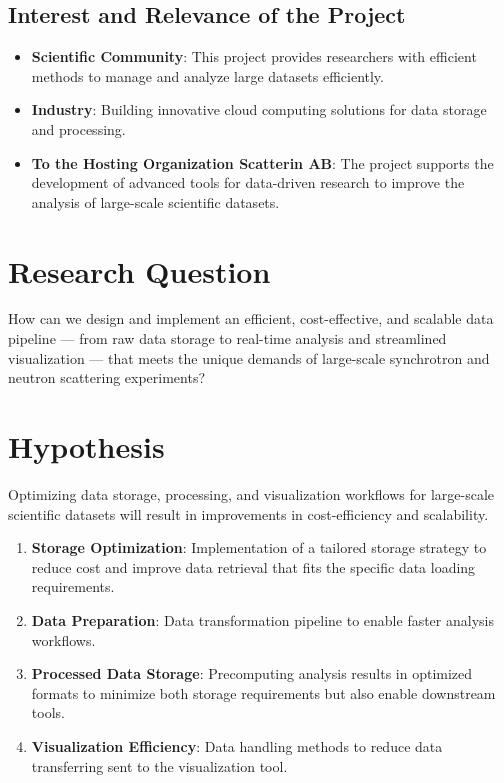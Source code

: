 \documentclass{article}
\begin{document}
\subsection{Interest and Relevance of the Project}
\begin{itemize}
    \item \textbf{Scientific Community}: This project provides researchers with efficient methods to manage and analyze large datasets efficiently.
    \item \textbf{Industry}: Building innovative cloud computing solutions for data storage and processing.
    \item \textbf{To the Hosting Organization Scatterin AB}: The project supports the development of advanced tools for data-driven research to improve the analysis of large-scale scientific datasets.
\end{itemize}

\section{Research Question}
How can we design and implement an efficient, cost-effective, and scalable data pipeline — from raw data storage to real-time analysis and streamlined visualization — that meets the unique demands of large-scale synchrotron and neutron scattering experiments?

\section{Hypothesis}
Optimizing data storage, processing, and visualization workflows for large-scale scientific datasets will result in improvements in cost-efficiency and scalability.

\begin{enumerate}
    \item \textbf{Storage Optimization}: Implementation of a tailored storage strategy to reduce cost and improve data retrieval that fits the specific data loading requirements.
    \item \textbf{Data Preparation}: Data transformation pipeline to enable faster analysis workflows.
    \item \textbf{Processed Data Storage}: Precomputing analysis results in optimized formats to minimize both storage requirements but also enable downstream tools.
    \item \textbf{Visualization Efficiency}: Data handling methods to reduce data transferring sent to the visualization tool.
\end{enumerate}
\end{document}
